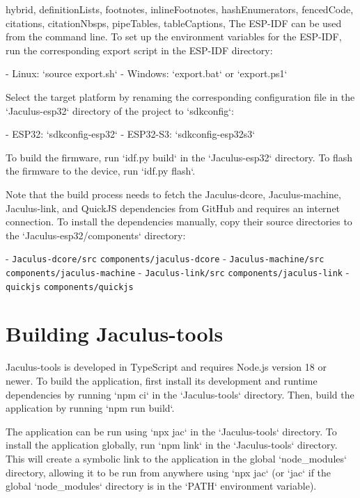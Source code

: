 \begin{markdown*}{%
  hybrid,
  definitionLists,
  footnotes,
  inlineFootnotes,
  hashEnumerators,
  fencedCode,
  citations,
  citationNbsps,
  pipeTables,
  tableCaptions,
}
The ESP-IDF can be used from the command line. To set up the environment variables for the ESP-IDF, run the corresponding export script in the ESP-IDF directory:

- Linux: `source export.sh`
- Windows: `export.bat` or `export.ps1`

Select the target platform by renaming the corresponding configuration file in the `Jaculus-esp32` directory of the project to `sdkconfig`:

- ESP32: `sdkconfig-esp32`
- ESP32-S3: `sdkconfig-esp32s3`

To build the firmware, run `idf.py build` in the `Jaculus-esp32` directory. To flash the firmware to the device, run `idf.py flash`.

Note that the build process needs to fetch the Jaculus-dcore, Jaculus-machine, Jaculus-link, and QuickJS dependencies from GitHub and requires an internet connection. To install the dependencies manually, copy their source directories to the `Jaculus-esp32/components` directory:

- \texttt{Jaculus-dcore/src} \rightarrow \texttt{components/jaculus-dcore}
- \texttt{Jaculus-machine/src} \rightarrow \texttt{components/jaculus-machine}
- \texttt{Jaculus-link/src} \rightarrow \texttt{components/jaculus-link}
- \texttt{quickjs} \rightarrow \texttt{components/quickjs}


\chapter{Building Jaculus-tools}

Jaculus-tools is developed in TypeScript and requires Node.js version 18 or newer. To build the application, first install its development and runtime dependencies by running `npm ci` in the `Jaculus-tools` directory. Then, build the application by running `npm run build`.

The application can be run using `npx jac` in the `Jaculus-tools` directory. To install the application globally, run `npm link` in the `Jaculus-tools` directory. This will create a symbolic link to the application in the global `node_modules` directory, allowing it to be run from anywhere using `npx jac` (or `jac` if the global `node_modules` directory is in the `PATH` environment variable).


\end{markdown*}

